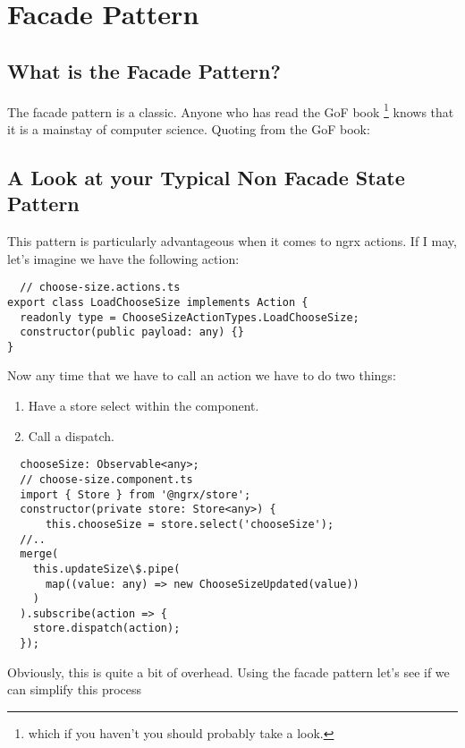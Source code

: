 
\chapter{ Facade Pattern }

\section{ What is the Facade Pattern? }
The facade pattern is a classic. Anyone who has read the GoF book \footnote{
which if you haven't you should probably take a look.} knows that it is a
mainstay of computer science. Quoting from the GoF book:


\section{ A Look at your Typical Non Facade State Pattern  }
This pattern is particularly advantageous when it comes to ngrx actions. If I
may, let's imagine we have the following action:

\begin{lstlisting}
  // choose-size.actions.ts
export class LoadChooseSize implements Action {
  readonly type = ChooseSizeActionTypes.LoadChooseSize;
  constructor(public payload: any) {}
}
\end{lstlisting}

Now any time that we have to call an action we have to do two things:
\begin{enumerate}
  \item Have a store select within the component.
  \item Call a dispatch.
\end{enumerate}

\begin{lstlisting}
  chooseSize: Observable<any>;
  // choose-size.component.ts
  import { Store } from '@ngrx/store';
  constructor(private store: Store<any>) {
      this.chooseSize = store.select('chooseSize');
  //..
  merge(
    this.updateSize\$.pipe(
      map((value: any) => new ChooseSizeUpdated(value))
    )
  ).subscribe(action => {
    store.dispatch(action);
  });
\end{lstlisting}

Obviously, this is quite a bit of overhead. Using the facade pattern let's see
if we can simplify this process

